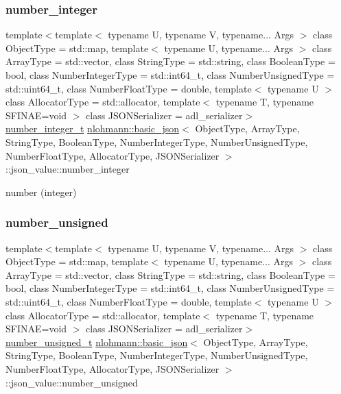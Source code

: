 \subsubsection{\texorpdfstring{number\+\_\+integer}{number\_integer}}
{\footnotesize\ttfamily template$<$template$<$ typename U, typename V, typename... Args $>$ class Object\+Type = std\+::map, template$<$ typename U, typename... Args $>$ class Array\+Type = std\+::vector, class String\+Type  = std\+::string, class Boolean\+Type  = bool, class Number\+Integer\+Type  = std\+::int64\+\_\+t, class Number\+Unsigned\+Type  = std\+::uint64\+\_\+t, class Number\+Float\+Type  = double, template$<$ typename U $>$ class Allocator\+Type = std\+::allocator, template$<$ typename T, typename S\+F\+I\+N\+A\+E=void $>$ class J\+S\+O\+N\+Serializer = adl\+\_\+serializer$>$ \\
\hyperlink{classnlohmann_1_1basic__json_a98e611d67b7bd75307de99c9358ab2dc}{number\+\_\+integer\+\_\+t} \hyperlink{classnlohmann_1_1basic__json}{nlohmann\+::basic\+\_\+json}$<$ Object\+Type, Array\+Type, String\+Type, Boolean\+Type, Number\+Integer\+Type, Number\+Unsigned\+Type, Number\+Float\+Type, Allocator\+Type, J\+S\+O\+N\+Serializer $>$\+::json\+\_\+value\+::number\+\_\+integer}



number (integer) 

\mbox{\label{unionnlohmann_1_1basic__json_1_1json__value_a0299a6aa3bc4d45d54130e52970f73d3}} 
\subsubsection{\texorpdfstring{number\+\_\+unsigned}{number\_unsigned}}
{\footnotesize\ttfamily template$<$template$<$ typename U, typename V, typename... Args $>$ class Object\+Type = std\+::map, template$<$ typename U, typename... Args $>$ class Array\+Type = std\+::vector, class String\+Type  = std\+::string, class Boolean\+Type  = bool, class Number\+Integer\+Type  = std\+::int64\+\_\+t, class Number\+Unsigned\+Type  = std\+::uint64\+\_\+t, class Number\+Float\+Type  = double, template$<$ typename U $>$ class Allocator\+Type = std\+::allocator, template$<$ typename T, typename S\+F\+I\+N\+A\+E=void $>$ class J\+S\+O\+N\+Serializer = adl\+\_\+serializer$>$ \\
\hyperlink{classnlohmann_1_1basic__json_ab906e29b5d83ac162e823ada2156b989}{number\+\_\+unsigned\+\_\+t} \hyperlink{classnlohmann_1_1basic__json}{nlohmann\+::basic\+\_\+json}$<$ Object\+Type, Array\+Type, String\+Type, Boolean\+Type, Number\+Integer\+Type, Number\+Unsigned\+Type, Number\+Float\+Type, Allocator\+Type, J\+S\+O\+N\+Serializer $>$\+::json\+\_\+value\+::number\+\_\+unsigned}



